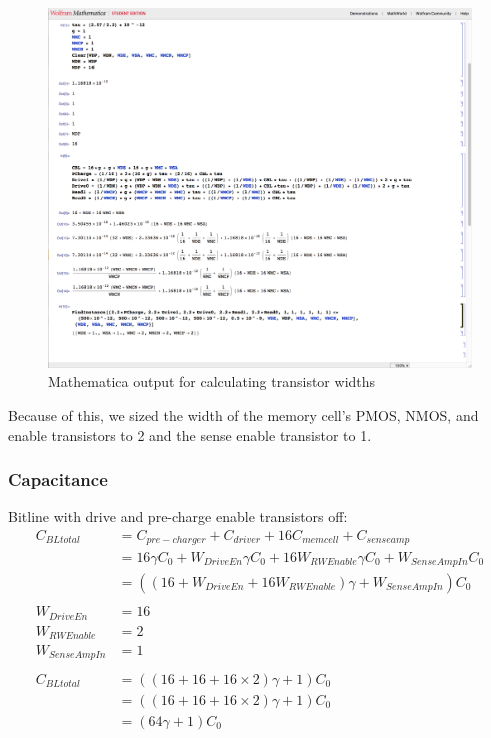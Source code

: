 \documentclass[a4paper]{article}
\begin{document}
\begin{figure}[H]
	\centering
	\includegraphics[scale=0.3]{sizingMath}
	\caption{Mathematica output for calculating transistor widths}
	\label{fig:sizingMath}
\end{figure}

Because of this, we sized the width of the memory cell's PMOS, NMOS, and enable transistors to 2 and the sense enable transistor to 1. 

\subsubsection{Capacitance}
\label{subsec:cap_calc}

Bitline with drive and pre-charge enable transistors off:
\begin{align*}
C_{BLtotal} &= C_{pre-charger} + C_{driver} + 16 C_{memcell} + C_{senseamp}\\
&= 16 \gamma C_0 + W_{DriveEn}\gamma C_0 + 16 W_{RWEnable}\gamma C_0 + W_{SenseAmpIn} C_0\\
&= ((16 + W_{DriveEn}  + 16 W_{RWEnable})\gamma + W_{SenseAmpIn})C_0\\\\
W_{DriveEn} &= 16\\
W_{RWEnable} &= 2\\
W_{SenseAmpIn} &= 1\\\\
C_{BLtotal} &= ((16 + 16  + 16 \times 2)\gamma + 1)C_0\\
&= ((16 + 16  + 16 \times 2)\gamma + 1)C_0\\
&= (64\gamma + 1) C_0
\end{align*}
\end{document}
